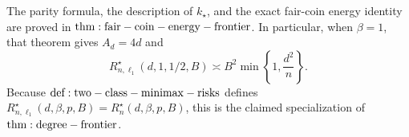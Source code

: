 The parity formula, the description of \(k_\star\), and the exact fair-coin energy identity are proved in \({\rm thm:fair-coin-energy-frontier}\). In particular, when \(\beta=1\), that theorem gives \(A_d=4d\) and
\[
R_{n,\ell_1}^\star(d,1,1/2,B)\asymp B^2\min\!\left\{1,\frac{d^2}{n}\right\}.
\]
Because \({\rm def:two-class-minimax-risks}\) defines \(R_{n,\ell_1}^\star(d,\beta,p,B)=R_n^\star(d,\beta,p,B)\), this is the claimed specialization of \({\rm thm:degree-frontier}\).